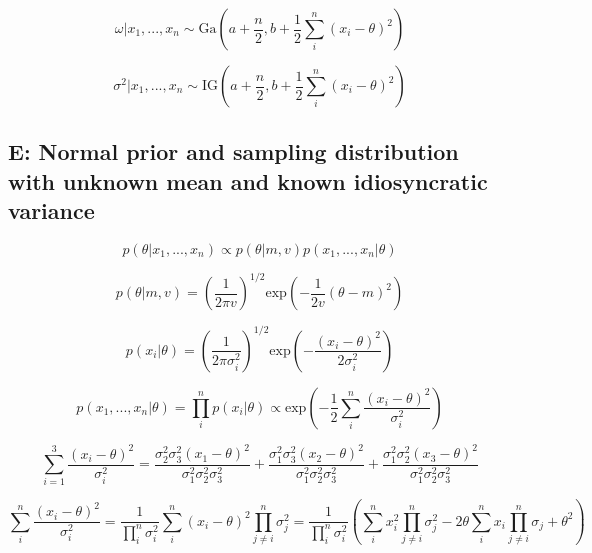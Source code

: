 \documentclass[12pt]{article}
\begin{document}
        \begin{equation}
              \omega | x_1,...,x_n \sim \text{Ga}\left (a + \frac{n}{2}, b+ \frac{1}{2}\sum_i^n(x_i - \theta)^2\right )
        \end{equation}

        \begin{equation}
              \sigma^2 | x_1,...,x_n \sim \text{IG}\left (a + \frac{n}{2}, b+ \frac{1}{2}\sum_i^n(x_i - \theta)^2\right )
        \end{equation}

    \subsection*{E: Normal prior and sampling distribution with unknown mean and known idiosyncratic variance}

        \begin{equation}
              p(\theta|x_1,..., x_n) \propto p(\theta|m,v)p(x_1,...,x_n|\theta)
        \end{equation}

        \begin{equation}
              p(\theta|m,v) = \left(\frac{1}{2 \pi v} \right )^{1/2} \text{exp}\left( - \frac{1}{2v} (\theta - m)^2\right )
        \end{equation}

        \begin{equation}
              p(x_i|\theta) = \left(\frac{1}{2 \pi \sigma_i^2} \right )^{1/2} \text{exp}\left( - \frac{(x_i - \theta)^2}{2 \sigma_i^2} \right )
        \end{equation}

        \begin{equation}
              p(x_1,...,x_n|\theta) = \prod_i^n p(x_i|\theta) \propto \text{exp}\left( - \frac{1}{2} \sum_i^n\frac{(x_i - \theta)^2}{\sigma_i^2} \right )
        \end{equation}

        \begin{equation}
              \sum_{i=1}^3\frac{(x_i - \theta)^2}{\sigma_i^2} = \frac{\sigma_2^2 \sigma_3^2 (x_1 - \theta)^2}{\sigma_1^2 \sigma_2^2 \sigma_3^2} + \frac{\sigma_1^2 \sigma_3^2 (x_2 - \theta)^2}{\sigma_1^2 \sigma_2^2 \sigma_3^2} + \frac{\sigma_1^2 \sigma_2^2 (x_3 - \theta)^2}{\sigma_1^2 \sigma_2^2 \sigma_3^2}
        \end{equation}

        \begin{equation}
              \sum_i^n \frac{(x_i - \theta)^2}{\sigma_i^2} = \frac{1}{\prod_i^n \sigma_i^2} \sum_i^n (x_i - \theta)^2 \prod_{j\neq i}^n \sigma_j^2 = \frac{1}{\prod_i^n \sigma_i^2} \left ( \sum_i^n x_i^2 \prod_{j \neq i}^n \sigma_j^2 - 2 \theta \sum_i^n x_i \prod_{j \neq i}^n \sigma_j + \theta^2 \right)
        \end{equation}
\end{document}
